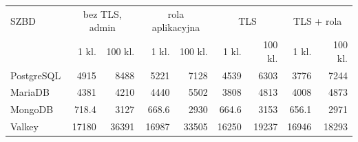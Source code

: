 \begin{tabular}{lrrrrrrrr}
\toprule
 SZBD & \multicolumn{2}{c}{bez TLS, admin} & \multicolumn{2}{c}{rola aplikacyjna} & \multicolumn{2}{c}{TLS} & \multicolumn{2}{c}{TLS + rola} \\
& 1 kl. & 100 kl. & 1 kl. & 100 kl. & 1 kl. & 100 kl. & 1 kl. & 100 kl. \\
\midrule
PostgreSQL & \num{4915} & \num{8488} & \num{5221} & \num{7128} & \num{4539} & \num{6303} & \num{3776} & \num{7244} \\
MariaDB & \num{4381} & \num{4210} & \num{4440} & \num{5502} & \num{3808} & \num{4813} & \num{4008} & \num{4873} \\
MongoDB & \num{718.4} & \num{3127} & \num{668.6} & \num{2930} & \num{664.6} & \num{3153} & \num{656.1} & \num{2971} \\
Valkey & \num{17180} & \num{36391} & \num{16987} & \num{33505} & \num{16250} & \num{19237} & \num{16946} & \num{18293} \\
\bottomrule
\end{tabular}
